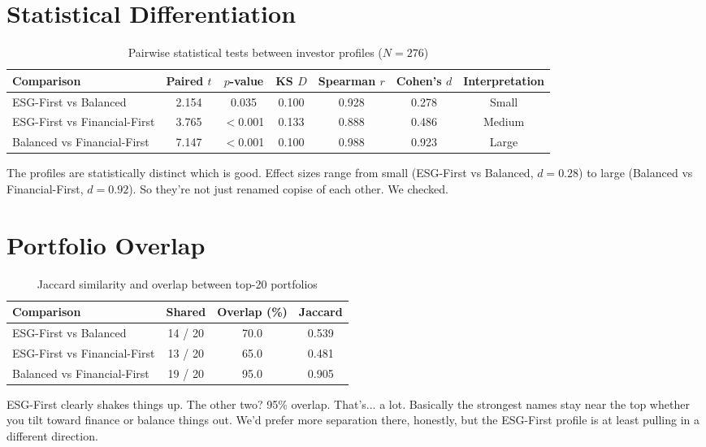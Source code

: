 \section{Statistical Differentiation}\label{sec:profile_stat}
\begin{table}[!htbp]
\centering
\caption{Pairwise statistical tests between investor profiles ($N = 276$)}\label{tab:profile_tests}
\small
\begin{tabular}{@{}lcccccc@{}}
\toprule
\textbf{Comparison} & \textbf{Paired $t$} & \textbf{$p$-value} & \textbf{KS $D$} & \textbf{Spearman $r$} & \textbf{Cohen's $d$} & \textbf{Interpretation} \\
\midrule
ESG-First vs Balanced & 2.154 & 0.035 & 0.100 & 0.928 & 0.278 & Small \\ ESG-First vs Financial-First & 3.765 & $<$0.001 & 0.133 & 0.888 & 0.486 & Medium \\ Balanced vs Financial-First & 7.147 & $<$0.001 & 0.100 & 0.988 & 0.923 & Large \\
\bottomrule
\end{tabular}
\end{table}
The profiles are statistically distinct which is good. Effect sizes range from small (ESG-First vs Balanced, $d=0.28$) to large (Balanced vs Financial-First, $d=0.92$). So they're not just renamed copise of each other. We checked.
\section{Portfolio Overlap}\label{sec:profile_overlap}
\begin{table}[!htbp]
\centering
\caption{Jaccard similarity and overlap between top-20 portfolios}\label{tab:profile_overlap}
\begin{tabular}{@{}lccc@{}}
\toprule
\textbf{Comparison} & \textbf{Shared} & \textbf{Overlap (\%)} & \textbf{Jaccard} \\
\midrule
ESG-First vs Balanced & 14 / 20 & 70.0 & 0.539 \\ ESG-First vs Financial-First & 13 / 20 & 65.0 & 0.481 \\ Balanced vs Financial-First & 19 / 20 & 95.0 & 0.905 \\
\bottomrule
\end{tabular}
\end{table}
ESG-First clearly shakes things up. The other two? 95\% overlap. That's... a lot. Basically the strongest names stay near the top whether you tilt toward finance or balance things out. We'd prefer more separation there, honestly, but the ESG-First profile is at least pulling in a different direction.
